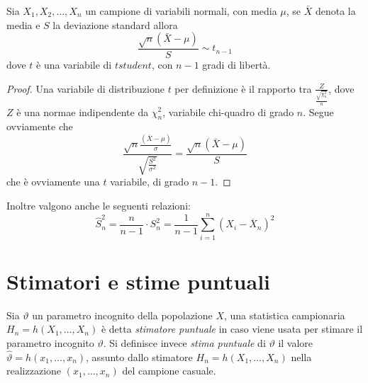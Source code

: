 \documentclass[a4paper,12pt, oneside]{book}
\begin{document}
\begin{teo}
    Sia $X_1, X_2, \dots, X_n$ un campione di variabili normali, con media $\mu$, se $\bar{X}$ denota la media e $S$ la
    deviazione standard allora 
    \[ \frac{\sqrt{n} (\bar{X} - \mu)}{S} \sim t_{n - 1} \]
    dove $t$ è una variabile di $t student$, con $n - 1$ gradi di libertà.
\end{teo}
\begin{proof}
    Una variabile di distribuzione $t$ per definizione è il rapporto tra $\frac{Z}{\frac{\sqrt{\chi_n^2}}{n}}$, dove
    $Z$ è una normae indipendente da $\chi_n^2$, variabile chi-quadro di grado $n$.\newline
    Segue ovviamente che 
    \[ \frac{\sqrt{n} \frac{(\bar{X} - \mu)}{\sigma}}{\sqrt{\frac{S^2}{\sigma^2}}} = \frac{\sqrt{n}(\bar{X} - \mu)}{S}       \]
    che è ovviamente una $t$ variabile, di grado $n - 1$.
\end{proof}
Inoltre valgono anche le seguenti relazioni:
\[\hat{S}_{n}^{2}=\frac{n}{n-1} \cdot S_{n}^{2}=\frac{1}{n-1} \sum_{i=1}^{n}\left(X_{i}-\overline{X}_{n}\right)^{2}\]

\section{Stimatori e stime puntuali}
Sia $\vartheta$ un parametro incognito della popolazione $X$, una statistica campionaria $H_n = h(X_1, \dots, X_n)$
è detta \emph{stimatore puntuale} in caso viene usata per stimare il parametro incognito $\vartheta$.\newline
Si definisce invece \emph{stima puntuale} di $\vartheta$ il valore $\hat{\vartheta} = h(x_1, \dots, x_n)$, assunto
dallo stimatore $H_n = h(X_1, \dots, X_n)$ nella realizzazione $(x_1, \dots, x_n)$ del campione casuale.
\end{document}
